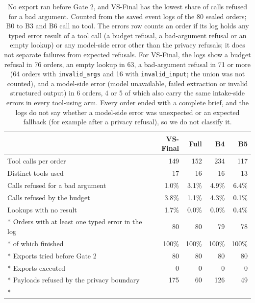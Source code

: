 \documentclass[11pt]{article}
\newcommand{\vs}{VS-Final}
\begin{document}
{\centering\footnotesize
\renewcommand{\arraystretch}{0.84}
\begin{longtable}{@{}lrrrr@{}}
\toprule
 & \vs{} & Full & B4 & B5 \\
\midrule
Tool calls per order & 149 & 152 & 234 & 117 \\
Distinct tools used & 17 & 16 & 16 & 13 \\
Calls refused for a bad argument & 1.0\% & 3.1\% & 4.9\% & 6.4\% \\
Calls refused by the budget & 3.8\% & 1.1\% & 4.3\% & 0.1\% \\
Lookups with no result & 1.7\% & 0.0\% & 0.0\% & 0.4\% \\*
Orders with at least one typed error in the log & 80 & 80 & 79 & 78 \\*
\quad of which finished & 100\% & 100\% & 100\% & 100\% \\*
Exports tried before Gate 2 & 80 & 80 & 80 & 80 \\*
Exports executed & 0 & 0 & 0 & 0 \\*
Payloads refused by the privacy boundary & 175 & 60 & 126 & 49 \\*
\bottomrule
\caption{No export ran before Gate 2, and \vs{} has the lowest share of calls refused for a bad argument. Counted from the saved event logs of the 80 sealed orders; B0 to B3 and B6 call no tool. The errors row counts an order if its log holds any typed error result of a tool call (a budget refusal, a bad-argument refusal or an empty lookup) or any model-side error other than the privacy refusals; it does not separate failures from expected refusals. For \vs{}, the logs show a budget refusal in 76 orders, an empty lookup in 63, a bad-argument refusal in 71 or more (64 orders with \texttt{invalid\_args} and 16 with \texttt{invalid\_input}; the union was not counted), and a model-side error (model unavailable, failed extraction or invalid structured output) in 6 orders, 4 or 5 of which also carry the same intake-side errors in every tool-using arm. Every order ended with a complete brief, and the logs do not say whether a model-side error was unexpected or an expected fallback (for example after a privacy refusal), so we do not classify it.}\label{tab:tools}\\
\end{longtable}}
\end{document}
